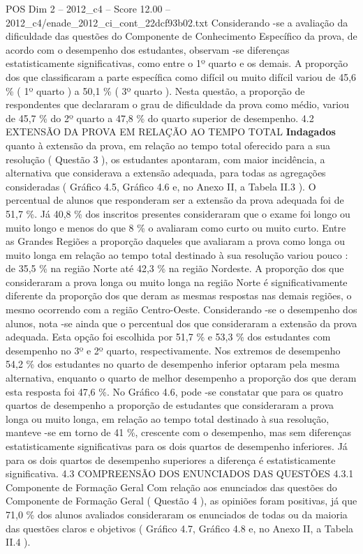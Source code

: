 \begin{textsample}{POS Dim 2 – 2012\_c4 – Score 12.00 – 2012\_c4/enade\_2012\_ci\_cont\_22dcf93b02.txt}
Considerando -se a avaliação da dificuldade das questões do Componente de Conhecimento Específico da prova, de acordo com o desempenho dos estudantes, observam -se diferenças estatisticamente significativas, como entre o 1º quarto e os demais.
A proporção dos que classificaram a parte específica como difícil ou muito difícil variou de 45,6 \% ( 1º quarto ) a 50,1 \% ( 3º quarto ).
Nesta questão, a proporção de respondentes que declararam o grau de dificuldade da prova como médio, variou de 45,7 \% do 2º quarto a 47,8 \% do quarto superior de desempenho. 4.2 EXTENSÃO DA PROVA EM RELAÇÃO AO TEMPO TOTAL \textbf{Indagados} quanto à extensão da prova, em relação ao tempo total oferecido para a sua resolução ( Questão 3 ), os estudantes apontaram, com maior incidência, a alternativa que considerava a extensão adequada, para todas as agregações consideradas ( Gráfico 4.5, Gráfico 4.6 e, no Anexo II, a Tabela II.3 ).
O percentual de alunos que responderam ser a extensão da prova adequada foi de 51,7 \%.
Já 40,8 \% dos inscritos presentes consideraram que o exame foi longo ou muito longo e menos do que 8 \% o avaliaram como curto ou muito curto.
Entre as Grandes Regiões a proporção daqueles que avaliaram a prova como longa ou muito longa em relação ao tempo total destinado à sua resolução variou pouco : de 35,5 \% na região Norte até 42,3 \% na região Nordeste.
A proporção dos que consideraram a prova longa ou muito longa na região Norte é significativamente diferente da proporção dos que deram as mesmas respostas nas demais regiões, o mesmo ocorrendo com a região Centro-Oeste.
Considerando -se o desempenho dos alunos, nota -se ainda que o percentual dos que consideraram a extensão da prova adequada.
Esta opção foi escolhida por 51,7 \% e 53,3 \% dos estudantes com desempenho no 3º e 2º quarto, respectivamente.
Nos extremos de desempenho 54,2 \% dos estudantes no quarto de desempenho inferior optaram pela mesma alternativa, enquanto o quarto de melhor desempenho a proporção dos que deram esta resposta foi 47,6 \%.
No Gráfico 4.6, pode -se constatar que para os quatro quartos de desempenho a proporção de estudantes que consideraram a prova longa ou muito longa, em relação ao tempo total destinado à sua resolução, manteve -se em torno de 41 \%, crescente com o desempenho, mas sem diferenças estatisticamente significativas para os dois quartos de desempenho inferiores.
Já para os dois quartos de desempenho superiores a diferença é estatisticamente significativa. 4.3 COMPREENSÃO DOS ENUNCIADOS DAS QUESTÕES 4.3.1 Componente de Formação Geral Com relação aos enunciados das questões do Componente de Formação Geral ( Questão 4 ), as opiniões foram positivas, já que 71,0 \% dos alunos avaliados consideraram os enunciados de todas ou da maioria das questões claros e objetivos ( Gráfico 4.7, Gráfico 4.8 e, no Anexo II, a Tabela II.4 ).

\end{textsample}
